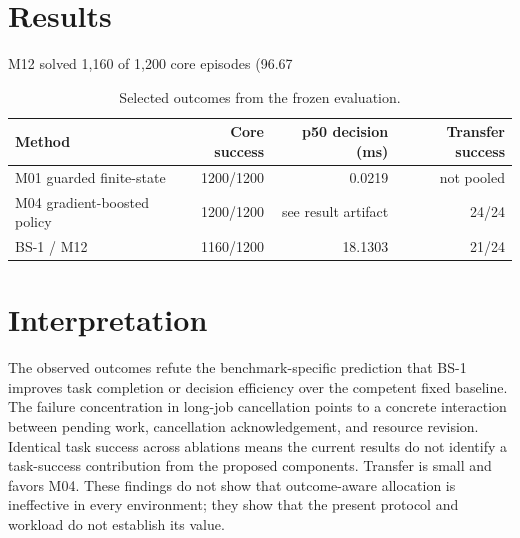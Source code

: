 \documentclass[11pt]{article}
\begin{document}
\section{Results}
M12 solved 1,160 of 1,200 core episodes (96.67%

\begin{table}[h]
\centering
\caption{Selected outcomes from the frozen evaluation.}
\begin{tabular}{lrrr}\toprule
Method & Core success & p50 decision (ms) & Transfer success \\\midrule
M01 guarded finite-state & 1200/1200 & 0.0219 & not pooled \\
M04 gradient-boosted policy & 1200/1200 & see result artifact & 24/24 \\
BS-1 / M12 & 1160/1200 & 18.1303 & 21/24 \\\bottomrule
\end{tabular}
\end{table}

\section{Interpretation}
The observed outcomes refute the benchmark-specific prediction that BS-1 improves task completion or decision efficiency over the competent fixed baseline. The failure concentration in long-job cancellation points to a concrete interaction between pending work, cancellation acknowledgement, and resource revision. Identical task success across ablations means the current results do not identify a task-success contribution from the proposed components. Transfer is small and favors M04. These findings do not show that outcome-aware allocation is ineffective in every environment; they show that the present protocol and workload do not establish its value.
\end{document}
